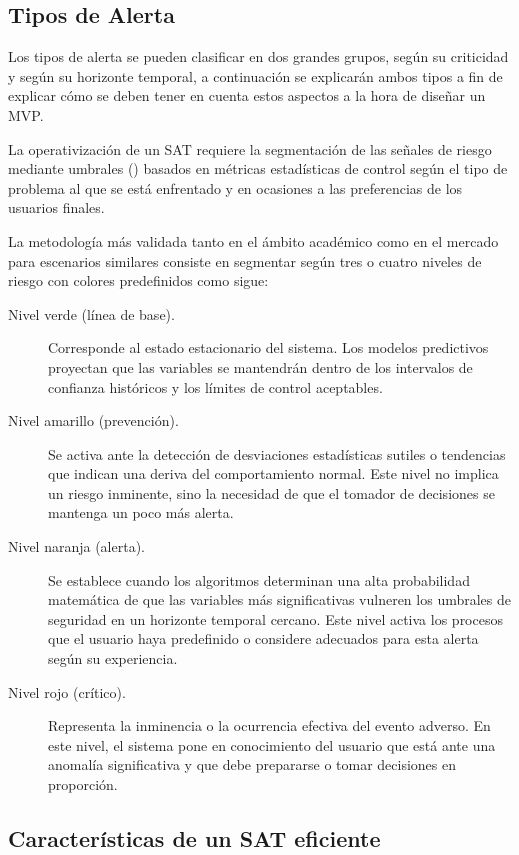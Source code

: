 \subsection{Tipos de Alerta}\label{tipos-de-alerta}

Los tipos de alerta se pueden clasificar en dos grandes grupos, según su criticidad y según su horizonte temporal, a continuación se explicarán ambos tipos a fin de explicar cómo se deben tener en cuenta estos aspectos a la hora de diseñar un MVP.

La operativización de un SAT requiere la segmentación de las señales de riesgo mediante umbrales () basados en métricas estadísticas de control según el tipo de problema al que se está enfrentado y en ocasiones a las preferencias de los usuarios finales.

La metodología más validada tanto en el ámbito académico como en el mercado para escenarios similares consiste en segmentar según tres o cuatro niveles de riesgo con colores predefinidos como sigue:

\begin{description}
  \item[Nivel verde (línea de base).] Corresponde al estado estacionario del sistema. Los modelos predictivos proyectan que las variables se mantendrán dentro de los intervalos de confianza históricos y los límites de control aceptables.
  \item[Nivel amarillo (prevención).] Se activa ante la detección de desviaciones estadísticas sutiles o tendencias que indican una deriva del comportamiento normal. Este nivel no implica un riesgo inminente, sino la necesidad de que el tomador de decisiones se mantenga un poco más alerta.
  \item[Nivel naranja (alerta).] Se establece cuando los algoritmos determinan una alta probabilidad matemática de que las variables más significativas vulneren los umbrales de seguridad en un horizonte temporal cercano. Este nivel activa los procesos que el usuario haya predefinido o considere adecuados para esta alerta según su experiencia.
  \item[Nivel rojo (crítico).] Representa la inminencia o la ocurrencia efectiva del evento adverso. En este nivel, el sistema pone en conocimiento del usuario que está ante una anomalía significativa y que debe prepararse o tomar decisiones en proporción.
\end{description}

\subsection{Características de un SAT eficiente}\label{caracteruxedsticas-de-un-sat-eficiente}

